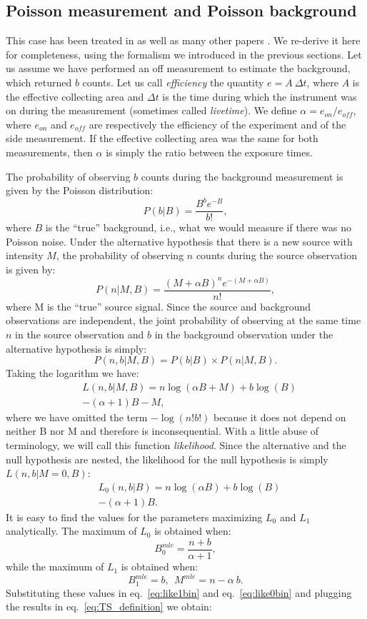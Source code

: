 \documentclass[twocolumn]{aastex61}
\begin{document}
\subsection{Poisson measurement and Poisson background}
\label{sec:pois_pois_sig}

This case has been treated in \citet{LiMa} as well as many other papers \citep[][and references therein]{Cousins2008}. We re-derive it here for completeness, using the formalism we introduced in the previous sections. Let us assume we have performed an off measurement to estimate the background, which returned $b$ counts. Let us call \textit{efficiency} the quantity $e = A~\Delta t$, where $A$ is the effective collecting area and $\Delta t$ is the time during which the instrument was on during the measurement (sometimes called \textit{livetime}). We define $\alpha = e_{on} / e_{off}$, where $e_{on}$ and $e_{off}$ are respectively the efficiency of the experiment and of the side measurement. If the effective collecting area was the same for both measurements, then $\alpha$ is simply the ratio between the exposure times.

The probability of observing $b$ counts during the background measurement is given by the Poisson distribution:
$$
P(b | B) = \frac{B^{b} e^{-B}}{b!},
$$
where $B$ is the ``true'' background, i.e., what we would measure if there was no Poisson noise. Under the alternative hypothesis that there is a new source with intensity $M$, the probability of observing $n$ counts during the source observation is given by:
$$
P(n | M, B) = \frac{(M + \alpha B)^{n} e^{-(M + \alpha B)}}{n!},
$$
where M is the ``true'' source signal. Since the source and background observations are independent, the joint probability of observing at the same time $n$ in the source observation and $b$ in the 
background observation under the alternative hypothesis is simply:
$$
P( n, b | M,B) = P(b | B) \times P(n | M, B).
$$
Taking the logarithm we have:
\begin{align}
& L(n, b | M, B) = n\log{(\alpha B + M)} + b \log{(B)} \nonumber \\
& - (\alpha + 1) B - M,
\label{eq:like1bin}
\end{align}
where we have omitted the term $- \log{(n! b!)}$ because it does not depend on neither B nor M and therefore is inconsequential.
With a little abuse of terminology, we will call this function \textit{likelihood}. Since the alternative and the null hypothesis are nested, the likelihood for the null hypothesis is simply $L(n, b | M=0, B)$:
\begin{align}
& L_0(n, b | B) = n\log{(\alpha B)} + b \log{(B)} \nonumber \\
& - (\alpha + 1) B.
\label{eq:like0bin}
\end{align}
It is easy to find the values for the parameters maximizing $L_{0}$ and $L_{1}$ analytically. The maximum of $L_{0}$ is obtained when:
$$
B^{mle}_0 = \frac{n + b}{\alpha + 1},
$$
while the maximum of $L_{1}$ is obtained when:
$$
B^{mle}_{1} = b,~~M^{mle} = n - \alpha~b.
$$
Substituting these values in eq.~\ref{eq:like1bin} and eq.~\ref{eq:like0bin} and plugging the results in eq.~\ref{eq:TS_definition} we obtain:
\end{document}
